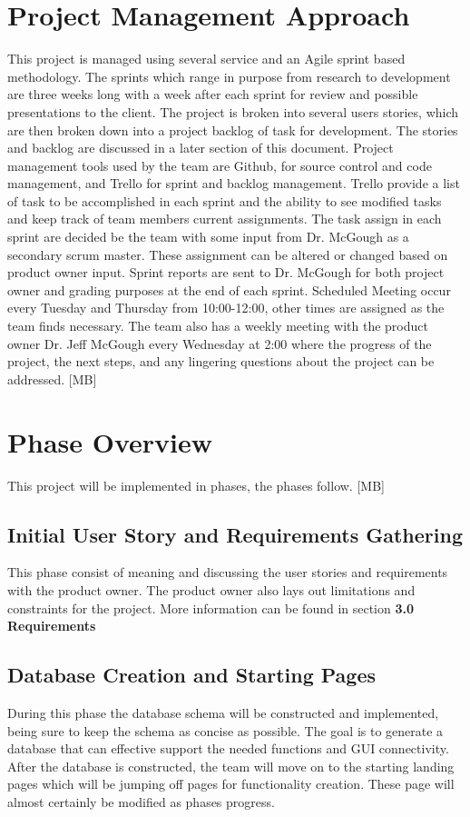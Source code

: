 \section{Project  Management Approach}
This project is managed using several service and an Agile sprint based methodology. The sprints which range in purpose from research to development are three weeks long with a week after each sprint for review and possible presentations to the client. The project is broken into several users stories, which are then broken down into a project backlog of task for development. The stories and backlog are discussed  in a later section of this document. 
Project management tools used by the team are Github, for source control and code management, and Trello for sprint and backlog management. Trello provide a list of task to be accomplished in each sprint and the ability to see modified tasks and keep track of team members current assignments. The task assign in each sprint are decided be the team with some input from Dr. McGough as a secondary scrum master. These assignment can be altered or changed based on product owner input. Sprint reports are sent to Dr. McGough for both project owner and grading purposes at the end of each sprint.
Scheduled Meeting occur every Tuesday and Thursday from 10:00-12:00, other times are assigned as the team finds necessary. The team also has a weekly meeting with the product owner Dr. Jeff McGough every Wednesday at 2:00 where the progress of the project, the next steps, and any lingering questions about the project can be addressed. [MB]


\section{Phase  Overview}
This project will be implemented in phases, the phases follow. [MB]

\subsection{Initial User Story and Requirements Gathering}
This phase consist of meaning and discussing the user stories and requirements with the product owner. The product owner also lays out limitations and constraints for the project. More information can be found in section \bf 3.0 Requirements

\subsection{Database Creation and Starting Pages}
During this phase the database schema will be constructed and implemented, being sure to keep the schema as concise as possible. The goal is to generate a database that can effective support the needed functions and GUI connectivity. After the database is constructed, the team will move on to the starting landing pages which will be jumping off pages for functionality creation. These page will almost certainly be modified as phases progress.

